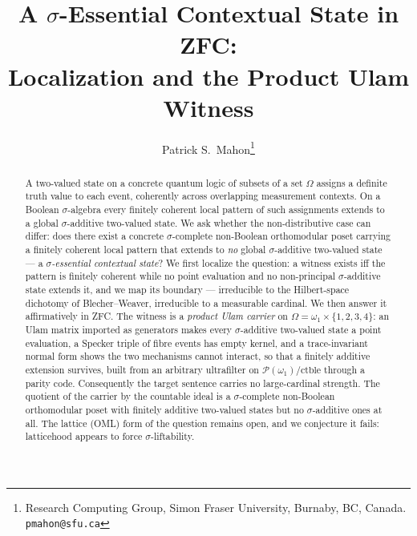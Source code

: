 \documentclass[11pt]{article}
\title{A $\sigma$-Essential Contextual State in ZFC:\\
Localization and the Product Ulam Witness}
\author{Patrick S.\ Mahon\thanks{%
  Research Computing Group, Simon Fraser University, Burnaby, BC, Canada.
  \texttt{pmahon@sfu.ca}}}
\date{}
\theoremstyle{definition}
\newif\ifstandalone
\begin{document}
\maketitle

\begin{abstract}
A two-valued state on a concrete quantum logic of subsets of a set $\Omega$
assigns a definite truth value to each event, coherently across overlapping
measurement contexts. On a Boolean $\sigma$-algebra every finitely coherent
local pattern of such assignments extends to a global $\sigma$-additive
two-valued state. We ask whether the non-distributive case can differ: does
there exist a concrete $\sigma$-complete non-Boolean orthomodular poset
carrying a finitely coherent local pattern that extends to \emph{no} global
$\sigma$-additive two-valued state --- a \emph{$\sigma$-essential contextual
state}? We first localize the question: a witness exists iff the pattern is
finitely coherent while no point evaluation and no non-principal
$\sigma$-additive state extends it, and we map its boundary --- irreducible
to the Hilbert-space dichotomy of Blecher--Weaver, irreducible to a measurable
cardinal. We then
answer it affirmatively in ZFC. The witness is a \emph{product Ulam carrier} on
$\Omega=\omega_1\times\{1,2,3,4\}$: an Ulam matrix imported as generators
makes every $\sigma$-additive two-valued state a point evaluation, a Specker
triple of fibre events has empty kernel, and a trace-invariant normal form
shows the two mechanisms cannot interact, so that a finitely additive extension
survives, built from an arbitrary ultrafilter on
$\mathcal P(\omega_1)/\mathrm{ctble}$ through a parity code. Consequently the
target sentence carries no large-cardinal strength. The quotient of the carrier
by the countable ideal is a $\sigma$-complete non-Boolean orthomodular poset
with finitely additive two-valued states but no $\sigma$-additive ones at all.
The lattice (OML) form of the question remains open, and we conjecture it fails:
latticehood appears to force $\sigma$-liftability.
\end{abstract}

\ifstandalone



\fi
\end{document}
